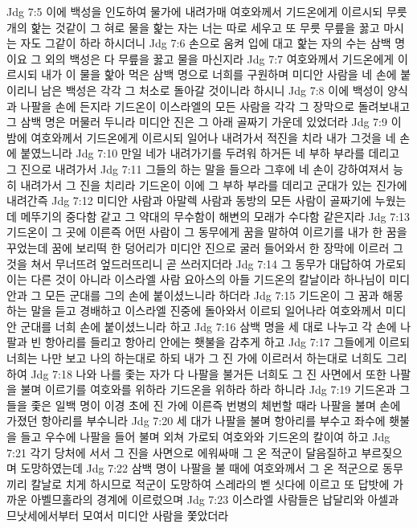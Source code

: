 Jdg 7:5  이에 백성을 인도하여 물가에 내려가매 여호와께서 기드온에게 이르시되 무릇 개의 핥는 것같이 그 혀로 물을 핥는 자는 너는 따로 세우고 또 무릇 무릎을 꿇고 마시는 자도 그같이 하라 하시더니
Jdg 7:6  손으로 움켜 입에 대고 핥는 자의 수는 삼백 명이요 그 외의 백성은 다 무릎을 꿇고 물을 마신지라
Jdg 7:7  여호와께서 기드온에게 이르시되 내가 이 물을 핥아 먹은 삼백 명으로 너희를 구원하며 미디안 사람을 네 손에 붙이리니 남은 백성은 각각 그 처소로 돌아갈 것이니라 하시니
Jdg 7:8  이에 백성이 양식과 나팔을 손에 든지라 기드온이 이스라엘의 모든 사람을 각각 그 장막으로 돌려보내고 그 삼백 명은 머물러 두니라 미디안 진은 그 아래 골짜기 가운데 있었더라
Jdg 7:9  이 밤에 여호와께서 기드온에게 이르시되 일어나 내려가서 적진을 치라 내가 그것을 네 손에 붙였느니라
Jdg 7:10  만일 네가 내려가기를 두려워 하거든 네 부하 부라를 데리고 그 진으로 내려가서
Jdg 7:11  그들의 하는 말을 들으라 그후에 네 손이 강하여져서 능히 내려가서 그 진을 치리라 기드온이 이에 그 부하 부라를 데리고 군대가 있는 진가에 내려간즉
Jdg 7:12  미디안 사람과 아말렉 사람과 동방의 모든 사람이 골짜기에 누웠는데 메뚜기의 중다함 같고 그 약대의 무수함이 해변의 모래가 수다함 같은지라
Jdg 7:13  기드온이 그 곳에 이른즉 어떤 사람이 그 동무에게 꿈을 말하여 이르기를 내가 한 꿈을 꾸었는데 꿈에 보리떡 한 덩어리가 미디안 진으로 굴러 들어와서 한 장막에 이르러 그것을 쳐서 무너뜨려 엎드러뜨리니 곧 쓰러지더라
Jdg 7:14  그 동무가 대답하여 가로되 이는 다른 것이 아니라 이스라엘 사람 요아스의 아들 기드온의 칼날이라 하나님이 미디안과 그 모든 군대를 그의 손에 붙이셨느니라 하더라
Jdg 7:15  기드온이 그 꿈과 해몽하는 말을 듣고 경배하고 이스라엘 진중에 돌아와서 이르되 일어나라 여호와께서 미디안 군대를 너희 손에 붙이셨느니라 하고
Jdg 7:16  삼백 명을 세 대로 나누고 각 손에 나팔과 빈 항아리를 들리고 항아리 안에는 횃불을 감추게 하고
Jdg 7:17  그들에게 이르되 너희는 나만 보고 나의 하는대로 하되 내가 그 진 가에 이르러서 하는대로 너희도 그리하여
Jdg 7:18  나와 나를 좇는 자가 다 나팔을 불거든 너희도 그 진 사면에서 또한 나팔을 불며 이르기를 여호와를 위하라 기드온을 위하라 하라 하니라
Jdg 7:19  기드온과 그들을 좇은 일백 명이 이경 초에 진 가에 이른즉 번병의 체번할 때라 나팔을 불며 손에 가졌던 항아리를 부수니라
Jdg 7:20  세 대가 나팔을 불며 항아리를 부수고 좌수에 횃불을 들고 우수에 나팔을 들어 불며 외쳐 가로되 여호와와 기드온의 칼이여 하고
Jdg 7:21  각기 당처에 서서 그 진을 사면으로 에워싸매 그 온 적군이 달음질하고 부르짖으며 도망하였는데
Jdg 7:22  삼백 명이 나팔을 불 때에 여호와께서 그 온 적군으로 동무끼리 칼날로 치게 하시므로 적군이 도망하여 스레라의 벧 싯다에 이르고 또 답밧에 가까운 아벨므홀라의 경계에 이르렀으며
Jdg 7:23  이스라엘 사람들은 납달리와 아셀과 므낫세에서부터 모여서 미디안 사람을 쫓았더라
